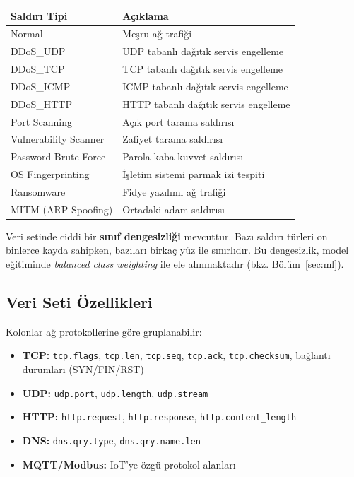 \documentclass[12pt,a4paper]{article}
\begin{document}
\begin{table}[H]\centering
\begin{tabular}{ll}
\toprule
\textbf{Saldırı Tipi} & \textbf{Açıklama} \\
\midrule
Normal              & Meşru ağ trafiği \\
DDoS\_UDP           & UDP tabanlı dağıtık servis engelleme \\
DDoS\_TCP           & TCP tabanlı dağıtık servis engelleme \\
DDoS\_ICMP          & ICMP tabanlı dağıtık servis engelleme \\
DDoS\_HTTP          & HTTP tabanlı dağıtık servis engelleme \\
Port Scanning       & Açık port tarama saldırısı \\
Vulnerability Scanner & Zafiyet tarama saldırısı \\
Password Brute Force  & Parola kaba kuvvet saldırısı \\
OS Fingerprinting   & İşletim sistemi parmak izi tespiti \\
Ransomware          & Fidye yazılımı ağ trafiği \\
MITM (ARP Spoofing) & Ortadaki adam saldırısı \\
\bottomrule
\end{tabular}
\end{table}

Veri setinde ciddi bir \textbf{sınıf dengesizliği} mevcuttur. Bazı saldırı türleri on binlerce kayda sahipken, bazıları birkaç yüz ile sınırlıdır. Bu dengesizlik, model eğitiminde \textit{balanced class weighting} ile ele alınmaktadır (bkz. Bölüm~\ref{sec:ml}).

\subsection{Veri Seti Özellikleri}
Kolonlar ağ protokollerine göre gruplanabilir:
\begin{itemize}[noitemsep]
  \item \textbf{TCP:} \texttt{tcp.flags}, \texttt{tcp.len}, \texttt{tcp.seq}, \texttt{tcp.ack}, \texttt{tcp.checksum}, bağlantı durumları (SYN/FIN/RST)
  \item \textbf{UDP:} \texttt{udp.port}, \texttt{udp.length}, \texttt{udp.stream}
  \item \textbf{HTTP:} \texttt{http.request}, \texttt{http.response}, \texttt{http.content\_length}
  \item \textbf{DNS:} \texttt{dns.qry.type}, \texttt{dns.qry.name.len}
  \item \textbf{MQTT/Modbus:} IoT'ye özgü protokol alanları
\end{itemize}
\end{document}
